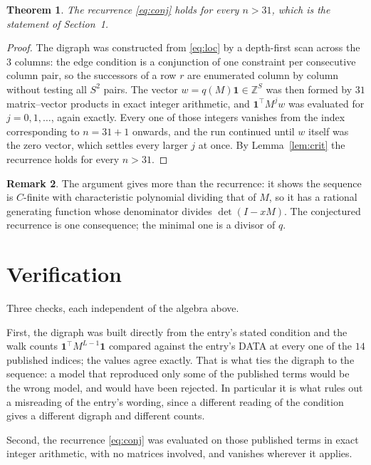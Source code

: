 \documentclass[11pt,a4paper]{article}
\theoremstyle{plain}
\newtheorem{theorem}{Theorem}
\theoremstyle{definition}
\newtheorem{remark}[theorem]{Remark}
\begin{document}
\begin{theorem}
The recurrence \eqref{eq:conj} holds for every $n>31$, which is the statement of
Section~1.
\end{theorem}

\begin{proof}
The digraph was constructed from \eqref{eq:loc} by a depth-first scan across the $3$
columns: the edge condition is a conjunction of one constraint per consecutive column
pair, so the successors of a row $r$ are enumerated column by column without testing all
$S^2$ pairs. The vector $w=q(M)\mathbf{1}\in\mathbb{Z}^{S}$ was then formed by $31$
matrix--vector products in exact integer arithmetic, and $\mathbf{1}^{\!\top}M^{j}w$ was
evaluated for $j=0,1,\dots$, again exactly. Every one of those integers vanishes from the
index corresponding to $n=31+1$ onwards, and the run continued until $w$ itself was the
zero vector, which settles every larger $j$ at once. By Lemma~\ref{lem:crit} the recurrence
holds for every $n>31$.
\end{proof}

\begin{remark}
The argument gives more than the recurrence: it shows the sequence is $C$-finite with
characteristic polynomial dividing that of $M$, so it has a rational generating function
whose denominator divides $\det(I-xM)$. The conjectured recurrence is one consequence; the
minimal one is a divisor of $q$.
\end{remark}

\section{Verification}

Three checks, each independent of the algebra above.

First, the digraph was built directly from the entry's stated condition and the walk counts
$\mathbf{1}^{\!\top}M^{L-1}\mathbf{1}$ compared against the entry's DATA at
every one of the $14$ published indices; the values agree exactly. That is what ties
the digraph to the sequence: a model that reproduced only some of the published terms would
be the wrong model, and would have been rejected. In particular it is what rules out a
misreading of the entry's wording, since a different reading of the condition gives a
different digraph and different counts.

Second, the recurrence \eqref{eq:conj} was evaluated on those published terms in exact
integer arithmetic, with no matrices involved, and vanishes wherever it applies.
\end{document}
